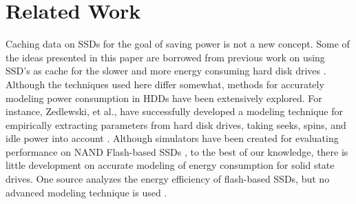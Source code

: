 \section{Related Work}
\label{sec:related}

Caching data on SSDs for the goal of saving power is not a new concept. Some of
the ideas presented in this paper are borrowed from previous work on using SSD's
as cache for the slower and more energy consuming hard disk drives
\cite{flash-disk-hybrid}. Although the techniques used here differ somewhat,
methods for accurately modeling power consumption in HDDs have been extensively
explored. For instance, Zedlewski, et al., have successfully developed a
modeling technique for empirically extracting parameters from hard disk drives,
taking seeks, spins, and idle power into account
\cite{hard-disk-power}. Although simulators have been created for evaluating
performance on NAND Flash-based SSDs \cite{flashsim}, to the best of our
knowledge, there is little development on accurate modeling of energy
consumption for solid state drives. One source analyzes the energy efficiency of
flash-based SSDs, but no advanced modeling technique is used
\cite{ssd-energy-efficiency}.
